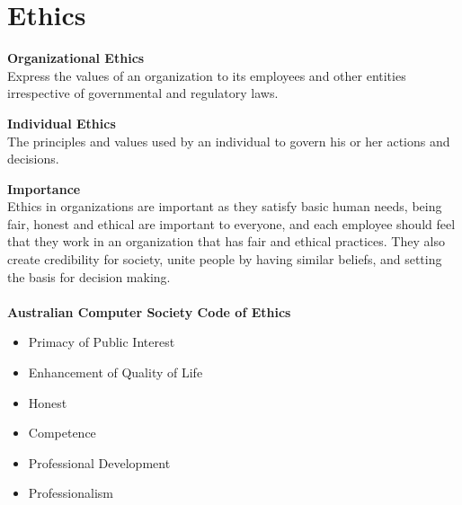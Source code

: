 \documentclass[a4paper,10pt]{article}
\begin{document}
\section*{Ethics} 
\begin{shaded}
\noindent \textcolor{BlueGreen}{\textbf{Organizational Ethics}} \\ 
Express the values of an organization to its employees and other entities irrespective of governmental and regulatory laws. 
\end{shaded}
\begin{shaded}
	\noindent \textcolor{BlueGreen}{\textbf{Individual Ethics}} \\ 
	The principles and values used by an individual to govern his or her actions and decisions. 
\end{shaded}
\textcolor{BlueGreen}{\textbf{Importance}} \\
Ethics in organizations are important as they satisfy basic human needs, being fair, honest and ethical are important to everyone, and each employee should feel that they work in an organization that has fair and ethical practices. They also create credibility for society, unite people by having similar beliefs, and setting the basis for decision making. \\\\
\textcolor{BlueGreen}{\textbf{Australian Computer Society Code of Ethics}} \\
\begin{itemize}
	\item Primacy of Public Interest 
	\item Enhancement of Quality of Life 
	\item Honest 
	\item Competence 
	\item Professional Development 
	\item Professionalism 
\end{itemize}
\newpage
\end{document}

